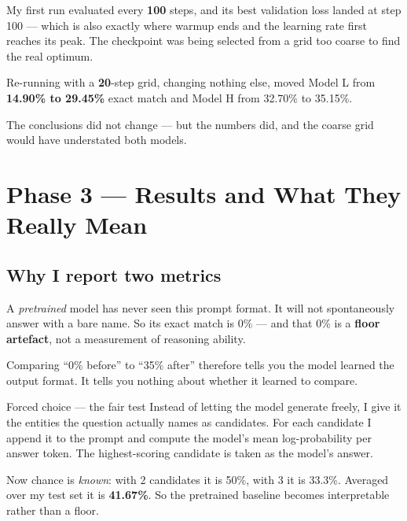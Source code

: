 \documentclass[11pt]{report}
\begin{document}
\begin{warnbox}
My first run evaluated every \textbf{100} steps, and its best validation loss
landed at step 100 --- which is also exactly where warmup ends and the learning
rate first reaches its peak. The checkpoint was being selected from a grid too
coarse to find the real optimum.

Re-running with a \textbf{20}-step grid, changing nothing else, moved Model L
from \textbf{14.90\% to 29.45\%} exact match and Model H from 32.70\% to
35.15\%.

The conclusions did not change --- but the numbers did, and the coarse grid
would have understated both models.
\end{warnbox}

\chapter{Phase 3 --- Results and What They Really Mean}

\section{Why I report two metrics}

\begin{warnbox}
A \emph{pretrained} model has never seen this prompt format. It will not
spontaneously answer with a bare name. So its exact match is 0\% --- and that
0\% is a \textbf{floor artefact}, not a measurement of reasoning ability.

Comparing ``0\% before'' to ``35\% after'' therefore tells you the model learned
the output format. It tells you nothing about whether it learned to compare.
\end{warnbox}

\begin{concept}{Forced choice --- the fair test}
Instead of letting the model generate freely, I give it the entities the
question actually names as candidates. For each candidate I append it to the
prompt and compute the model's mean log-probability per answer token. The
highest-scoring candidate is taken as the model's answer.

Now chance is \emph{known}: with 2 candidates it is 50\%, with 3 it is 33.3\%.
Averaged over my test set it is \textbf{41.67\%}. So the pretrained baseline
becomes interpretable rather than a floor.
\end{concept}
\end{document}
